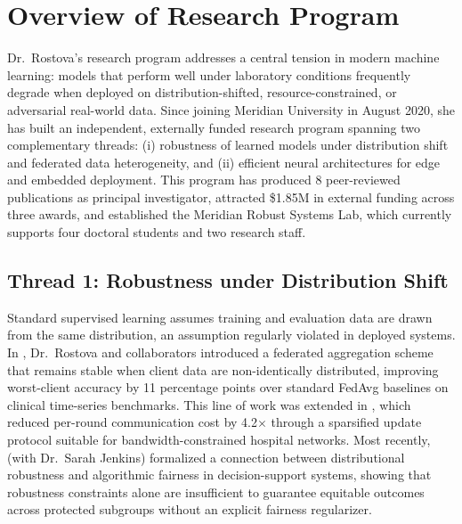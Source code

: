 
\section{Overview of Research Program}
Dr.\ Rostova's research program addresses a central tension in modern machine learning: models that perform well under laboratory conditions frequently degrade when deployed on distribution-shifted, resource-constrained, or adversarial real-world data. Since joining Meridian University in August 2020, she has built an independent, externally funded research program spanning two complementary threads: (i) robustness of learned models under distribution shift and federated data heterogeneity, and (ii) efficient neural architectures for edge and embedded deployment. This program has produced 8 peer-reviewed publications as principal investigator, attracted \$1.85M in external funding across three awards, and established the Meridian Robust Systems Lab, which currently supports four doctoral students and two research staff.

\subsection{Thread 1: Robustness under Distribution Shift}
Standard supervised learning assumes training and evaluation data are drawn from the same distribution, an assumption regularly violated in deployed systems. In \citep{rostova2022robust}, Dr.\ Rostova and collaborators introduced a federated aggregation scheme that remains stable when client data are non-identically distributed, improving worst-client accuracy by 11 percentage points over standard FedAvg baselines on clinical time-series benchmarks. This line of work was extended in \citep{rostova2021federated}, which reduced per-round communication cost by 4.2$\times$ through a sparsified update protocol suitable for bandwidth-constrained hospital networks. Most recently, \citep{jenkins2024fairness} (with Dr.\ Sarah Jenkins) formalized a connection between distributional robustness and algorithmic fairness in decision-support systems, showing that robustness constraints alone are insufficient to guarantee equitable outcomes across protected subgroups without an explicit fairness regularizer.

